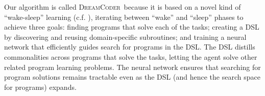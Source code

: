 \documentclass{article}
\newcommand{\system}{\textsc{DreamCoder}~}
\newcommand{\systemEnding}{\textsc{DreamCoder}}
\begin{document}
Our algorithm is called \system because it is based on a
novel kind of ``wake-sleep'' learning (c.f. \cite{hinton1995wake}), iterating
between ``wake'' and ``sleep'' phases to achieve three goals: finding
programs that solve each of the tasks; creating a DSL by discovering
and reusing domain-specific subroutines; and training a neural network
that efficiently guides search for programs in the DSL. The DSL
distills commonalities across programs that solve the tasks, letting
the agent solve other related program learning problems. The neural
network ensures that searching for program solutions remains tractable
even as the DSL (and hence the search space for programs) expands.





\end{document}
